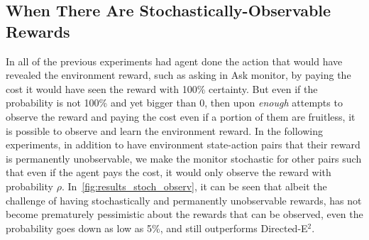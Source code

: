\subsection{When There Are Stochastically-Observable Rewards}
\label{appendix:stochas_obsrv}
In all of the previous experiments had agent done the action that would have revealed the environment reward, such as asking in Ask monitor, by paying the cost it would have seen the reward with 100\% certainty. But even if the probability is not 100\% and yet bigger than 0, then upon \emph{enough} attempts to observe the reward and paying the cost even if a portion of them are fruitless, it is possible to observe and learn the environment reward. In the following experiments, in addition to have environment state-action pairs that their reward is permanently unobservable, we make the monitor stochastic for other pairs such that even if the agent pays the cost, it would only observe the reward with probability $\rho$. In~\cref{fig:results_stoch_observ}, it can be seen that albeit the challenge of having stochastically and permanently unobservable rewards, \thealgo has not become prematurely pessimistic about the rewards that can be observed, even the probability goes down as low as 5\%, and still outperforms Directed-E$^2$.
%
%
%
